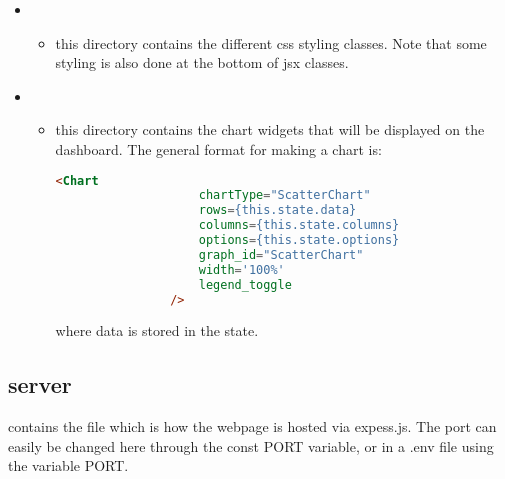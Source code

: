 \documentclass[12pt, titlepage, a4paper]{article}
\begin{document}
\begin{itemize}
    \item {}
        \begin{itemize}
            \item this directory contains the different css styling classes. Note that some styling is also done at the bottom of jsx classes.
        \end{itemize}
    \item {} 
        \begin{itemize}
            \item this directory contains the chart widgets that will be displayed on the dashboard. The general format for making a chart is:
            \begin{lstlisting}[language=HTML]
                <Chart
                    chartType="ScatterChart"
                    rows={this.state.data}
                    columns={this.state.columns}
                    options={this.state.options}
                    graph_id="ScatterChart"
                    width='100%'
                    legend_toggle 
                />
            \end{lstlisting}
            where data is stored in the state.
        \end{itemize}
\end{itemize}

\subsection{server}

 contains the file  which is how the webpage is hosted via expess.js. The port can easily be changed here through the const PORT variable, or in a .env file using the variable PORT.
\end{document}

